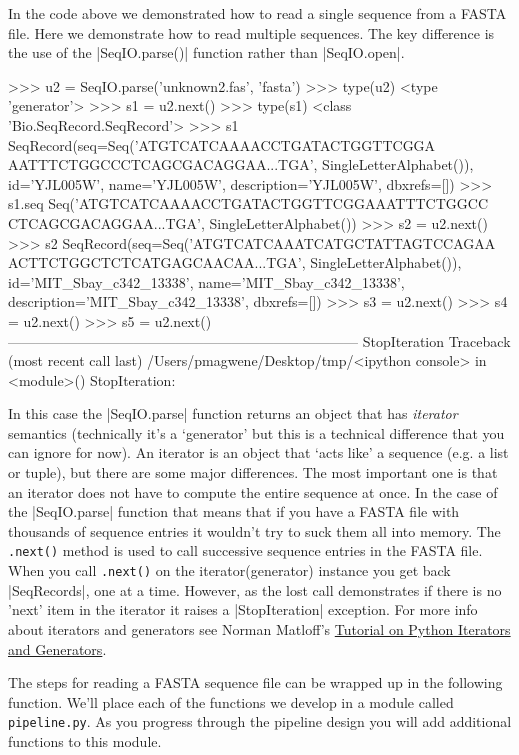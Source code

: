 \documentclass[10pt,letterpaper]{scrartcl}
\begin{document}
In the code above we demonstrated how to read a single sequence from a FASTA file.  Here we demonstrate how to read multiple sequences.  The key difference is the use of the |SeqIO.parse()| function rather than |SeqIO.open|.

\begin{python}
>>> u2 = SeqIO.parse('unknown2.fas', 'fasta')
>>> type(u2)
<type 'generator'>
>>> s1 = u2.next()
>>> type(s1)
<class 'Bio.SeqRecord.SeqRecord'>
>>> s1
SeqRecord(seq=Seq('ATGTCATCAAAACCTGATACTGGTTCGGA
AATTTCTGGCCCTCAGCGACAGGAA...TGA', SingleLetterAlphabet()), 
id='YJL005W', name='YJL005W', description='YJL005W', dbxrefs=[])
>>> s1.seq
Seq('ATGTCATCAAAACCTGATACTGGTTCGGAAATTTCTGGCC
CTCAGCGACAGGAA...TGA', SingleLetterAlphabet())
>>> s2 = u2.next()
>>> s2
SeqRecord(seq=Seq('ATGTCATCAAATCATGCTATTAGTCCAGAA
ACTTCTGGCTCTCATGAGCAACAA...TGA', SingleLetterAlphabet()), 
id='MIT_Sbay_c342_13338', name='MIT_Sbay_c342_13338', 
description='MIT_Sbay_c342_13338', dbxrefs=[])
>>> s3 = u2.next()
>>> s4 = u2.next()
>>> s5 = u2.next()
---------------------------------------------------------------------------
StopIteration                             Traceback (most recent call last)
/Users/pmagwene/Desktop/tmp/<ipython console> in <module>()
StopIteration: 
\end{python}

In this case the |SeqIO.parse| function returns an object that has \emph{iterator} semantics (technically it's a `generator' but this is a technical difference that you can ignore for now). An iterator is an object that `acts like' a sequence (e.g. a list or tuple), but there are some major differences. The most important one is that an iterator does not have to compute the entire sequence at once. In the case of the |SeqIO.parse| function that means that if you have a FASTA file with thousands of sequence entries it wouldn't try to suck them all into memory. The \verb=.next()= method is used to call successive sequence entries in the FASTA file. When you call \verb=.next()= on the iterator(generator) instance you get back |SeqRecords|, one at a time. However, as the lost call demonstrates if there is no 'next' item in the iterator it raises a |StopIteration| exception. For more info about iterators and generators see Norman Matloff's  \href{http://heather.cs.ucdavis.edu/~matloff/Python/PyIterGen.pdf}{Tutorial on Python Iterators and Generators}. 

The steps for reading a FASTA sequence file can be wrapped up in the following function. We'll place each of the functions we develop in a module called \verb=pipeline.py=.  As you progress through the pipeline design you will add additional functions to this module.
\end{document}
